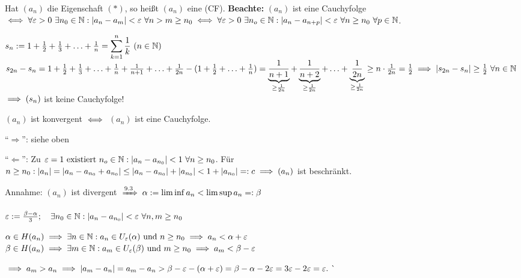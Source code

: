 \documentclass[a4paper,oneside,DIV15,BCOR12mm]{scrbook}
\begin{document}
\begin{definition}
Hat $(a_n)$ die Eigenschaft $(*)$, so heißt $(a_n)$ eine  (CF).
\textbf{Beachte:} $(a_n)$ ist eine Cauchyfolge $\iff \forall \varepsilon > 0 \ \exists n_0 \in\mathbb{N}: |a_n-a_m| < \varepsilon \ \forall n>m\ge n_0 \iff \forall \varepsilon >0 \ \exists n_o\in\mathbb{N}: |a_n - a_{n+p}| < \varepsilon \ \forall n\ge n_0 \ \forall p \in\mathbb{N}$.
\end{definition}

\begin{beispiel}
$s_n := 1 + \frac{1}{2} + \frac{1}{3} + \ldots + \frac{1}{n} = \displaystyle\sum_{k=1}^n \frac{1}{k} \ (n\in\MdN)$\\
$s_{2n} - s_n = 1 + \frac{1}{2} + \frac{1}{3} + \ldots + \frac{1}{n} + \frac{1}{n+1} + \ldots + \frac{1}{2n} - (1+ \frac{1}{2} + \ldots + \frac{1}{n}) =  \underbrace{\frac{1}{n+1}}_{\ge\frac{1}{2n}} + \underbrace{\frac{1}{n+2}}_{\ge\frac{1}{2n}} + \ldots + \underbrace{\frac{1}{2n}}_{\ge \frac{1}{2n}} \ge n \cdot \frac{1}{2n} = \frac{1}{2} \implies |s_{2n} - s_n| \ge \frac{1}{2} \ \forall n\in\mathbb{N}$
$\implies (s_n)$ ist keine Cauchyfolge!
\end{beispiel}

\begin{satz}
$(a_n)$ ist konvergent $\iff$ $(a_n)$ ist eine Cauchyfolge.
\end{satz}

\begin{beweis}
"`$\Rightarrow$"': siehe oben

"`$\Leftarrow$"': Zu $\varepsilon=1 \text{ existiert } n_o\in\mathbb{N}: |a_n-a_{n_0}| < 1\ \forall n \ge n_0$. Für $n \ge n_0: |a_n| = |a_n-a_{n_0}+a_{n_0}| \le |a_n-a_{n_0}| + |a_{n_0}| < 1+|a_{n_0}| =: c \implies (a_n)$ ist beschränkt.

Annahme: $(a_n)$ ist divergent $\folgtnach{9.3} \alpha := \lim\inf a_n < \lim\sup a_n =: \beta$

$\varepsilon:=\frac{\beta-\alpha}{3};\quad\exists n_0\in\mathbb{N}: |a_n-a_{n_0}| < \varepsilon\ \forall n,m \ge n_0$

$\alpha \in H(a_n) \implies \exists n\in\mathbb{N}: a_n \in U_{\varepsilon}(\alpha)\text{ und } n \ge n_0 \implies a_n<\alpha+\varepsilon$\\
$\beta \in H(a_n) \implies \exists m\in\mathbb{N}: a_m \in U_{\varepsilon}(\beta)\text{ und } m \ge n_0 \implies a_m<\beta-\varepsilon$

$\implies a_m > a_n \implies |a_m-a_n| = a_m-a_n > \beta-\varepsilon-(\alpha+\varepsilon) = \beta-\alpha-2\varepsilon = 3\varepsilon-2\varepsilon = \varepsilon.\ \lightning$
\end{beweis}
\end{document}
